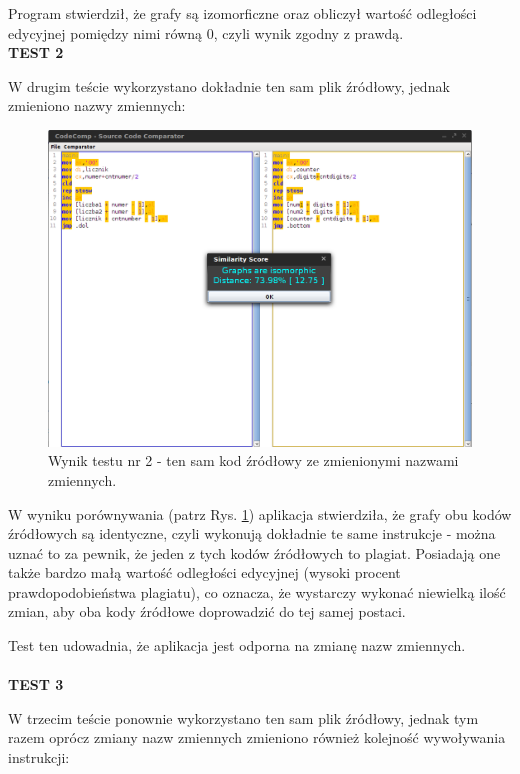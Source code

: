 \documentclass[a4paper,12pt]{article}
\begin{document}
Program stwierdził, że grafy są izomorficzne oraz obliczył wartość odległości edycyjnej pomiędzy nimi równą 0, czyli wynik zgodny z prawdą.
\\
\textbf{TEST 2}

W drugim teście wykorzystano dokładnie ten sam plik źródłowy, jednak zmieniono nazwy zmiennych:
\\
\begin{figure}[here]
\centering
\includegraphics[scale=0.4]{gfx/test2.png}
\caption{Wynik testu nr 2 - ten sam kod źródłowy ze zmienionymi nazwami zmiennych.}
\label{fig:test2}
\end{figure}

W wyniku porównywania (patrz Rys. \ref{fig:test2}) aplikacja stwierdziła, że grafy obu kodów źródłowych są identyczne, czyli wykonują dokładnie te same instrukcje - można uznać to za pewnik, że jeden z tych kodów źródłowych to plagiat. Posiadają one także bardzo małą wartość odległości edycyjnej (wysoki procent prawdopodobieństwa plagiatu), co oznacza, że wystarczy wykonać niewielką ilość zmian, aby oba kody źródłowe doprowadzić do tej samej postaci.

Test ten udowadnia, że aplikacja jest odporna na zmianę nazw zmiennych.
\\
\pagebreak
\\
\textbf{TEST 3}

W trzecim teście ponownie wykorzystano ten sam plik źródłowy, jednak tym razem oprócz zmiany nazw zmiennych zmieniono również kolejność wywoływania instrukcji:
\end{document}
